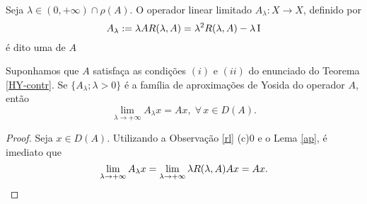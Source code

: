 \begin{definition}
Seja $\lambda \in (0,+\infty) \cap \rho(A)$. O operador linear limitado $A_\lambda: X\longrightarrow X$, definido por 
\begin{equation*}
A_\lambda :=\lambda AR(\lambda,A) =\lambda^2R(\lambda,A) -\lambda \operatorname{I} 
\end{equation*}
é dito uma  de $A$
\end{definition}

\begin{lemma}\label{Plem3.3}
 Suponhamos que $A$ satisfaça as condições $(i)$ e $(ii)$ do enunciado do Teorema \ref{HY-contr}.
Se $\{ A_\lambda ; \lambda >0 \}$ é a família de aproximações de Yosida do operador $A$, então
\begin{equation*}
\lim_{\lambda \to +\infty}A_\lambda x=Ax,\; \forall\, x\in D(A).
\end{equation*}
\end{lemma}
\begin{proof}
Seja $x\in D(A)$. Utilizando a Observação \ref{rl} (c)0 e o Lema \ref{ap}, é imediato que
\begin{equation*}
\lim_{\lambda \to +\infty}A_\lambda x=\lim_{\lambda \to +\infty}\lambda R(\lambda,A) Ax=Ax.
\end{equation*}
\end{proof}

